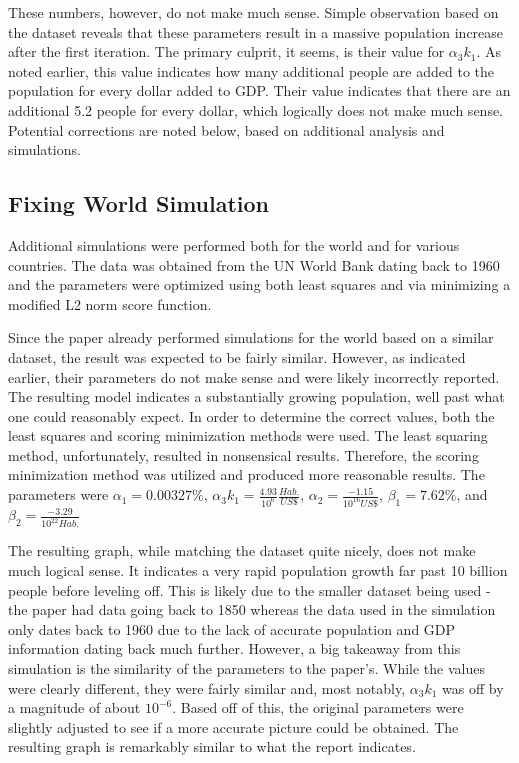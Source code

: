\documentclass[a4paper]{article}
\begin{document}
These numbers, however, do not make much sense. Simple observation based on the dataset reveals that these parameters result in a massive population increase after the first iteration. The primary culprit, it seems, is their value for $\alpha_3 k_1$. As noted earlier, this value indicates how many additional people are added to the population for every dollar added to GDP. Their value indicates that there are an additional 5.2 people for every dollar, which logically does not make much sense. Potential corrections are noted below, based on additional analysis and simulations.

\subsection{Fixing World Simulation}

Additional simulations were performed both for the world and for various countries. The data was obtained from the UN World Bank dating back to 1960 and the parameters were optimized using both least squares and via minimizing a modified L2 norm score function.

Since the paper already performed simulations for the world based on a similar dataset, the result was expected to be fairly similar. However, as indicated earlier, their parameters do not make sense and were likely incorrectly reported. The resulting model indicates a substantially growing population, well past what one could reasonably expect. In order to determine the correct values, both the least squares and scoring minimization methods were used. The least squaring method, unfortunately, resulted in nonsensical results. Therefore, the scoring minimization method was utilized and produced more reasonable results. The parameters were $\alpha_1 =0.00327\%$, $\alpha_3 k_1 = \frac{4.93}{10^6} \frac{Hab.}{US \$}$, $\alpha_2 = \frac{-1.15}{10^{16} US \$}$, $\beta_1 = 7.62\%$, and $\beta_2 = \frac{-3.29}{10^{22} Hab.}$ 

The resulting graph, while matching the dataset quite nicely, does not make much logical sense. It indicates a very rapid population growth far past 10 billion people before leveling off. This is likely due to the smaller dataset being used - the paper had data going back to 1850 whereas the data used in the simulation only dates back to 1960 due to the lack of accurate population and GDP information dating back much further. However, a big takeaway from this simulation is the similarity of the parameters to the paper's. While the values were clearly different, they were fairly similar and, most notably, $\alpha_3 k_1$ was off by a magnitude of about $10^{-6}$. Based off of this, the original parameters were slightly adjusted to see if a more accurate picture could be obtained. The resulting graph is remarkably similar to what the report indicates. 
\end{document}
